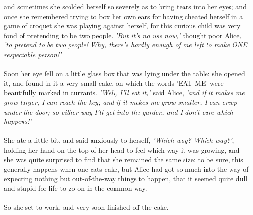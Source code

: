 \documentclass[12pt]{article}
\begin{document}
and sometimes she scolded herself so severely as to bring tears into
her eyes; and once she remembered trying to box her own ears for having
cheated herself in a game of croquet she was playing against herself,
for this curious child was very fond of pretending to be two people.
\textit{'But it's no use now,'} thought poor Alice, \textit{'to pretend to be two people!
Why, there's hardly enough of me left to make ONE respectable person!'}\\\\Soon her eye fell on a little glass box that was lying under the table:
she opened it, and found in it a very small cake, on which the words
\textmd{'EAT ME'} were beautifully marked in currants. \textit{'Well, I'll eat it,'} said
Alice, \textit{'and if it makes me grow larger, I can reach the key; and if it
makes me grow smaller, I can creep under the door; so either way I'll
get into the garden, and I don't care which happens!'}\\\\She ate a little bit, and said anxiously to herself, \textit{'Which way? Which
    way?'}, holding her hand on the top of her head to feel which way it was
growing, and she was quite surprised to find that she remained the same
size: to be sure, this generally happens when one eats cake, but Alice
had got so much into the way of expecting nothing but out-of-the-way
things to happen, that it seemed quite dull and stupid for life to go on
in the common way.\\\\So she set to work, and very soon finished off the cake.\\\\
\end{document}
